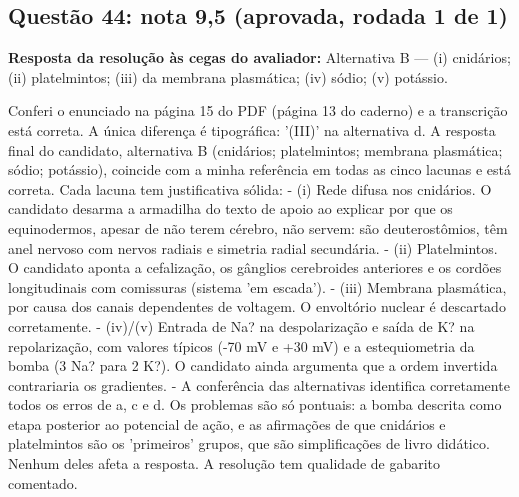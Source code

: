 \documentclass{article}%
\begin{document}
\subsection*{Questão 44: nota 9,5 (aprovada, rodada 1 de 1)}%
\textbf{Resposta da resolução às cegas do avaliador:} Alternativa B --- (i) cnidários; (ii) platelmintos; (iii) da membrana plasmática; (iv) sódio; (v) potássio.\par %
Conferi o enunciado na página 15 do PDF (página 13 do caderno) e a transcrição está correta. A única diferença é tipográfica: '(III)' na alternativa d. A resposta final do candidato, alternativa B (cnidários; platelmintos; membrana plasmática; sódio; potássio), coincide com a minha referência em todas as cinco lacunas e está correta. Cada lacuna tem justificativa sólida:\newline%
{-} (i) Rede difusa nos cnidários. O candidato desarma a armadilha do texto de apoio ao explicar por que os equinodermos, apesar de não terem cérebro, não servem: são deuterostômios, têm anel nervoso com nervos radiais e simetria radial secundária.\newline%
{-} (ii) Platelmintos. O candidato aponta a cefalização, os gânglios cerebroides anteriores e os cordões longitudinais com comissuras (sistema 'em escada').\newline%
{-} (iii) Membrana plasmática, por causa dos canais dependentes de voltagem. O envoltório nuclear é descartado corretamente.\newline%
{-} (iv)/(v) Entrada de Na? na despolarização e saída de K? na repolarização, com valores típicos (-70 mV e +30 mV) e a estequiometria da bomba (3 Na? para 2 K?). O candidato ainda argumenta que a ordem invertida contrariaria os gradientes.\newline%
{-} A conferência das alternativas identifica corretamente todos os erros de a, c e d.\newline%
\newline%
Os problemas são só pontuais: a bomba descrita como etapa posterior ao potencial de ação, e as afirmações de que cnidários e platelmintos são os 'primeiros' grupos, que são simplificações de livro didático. Nenhum deles afeta a resposta. A resolução tem qualidade de gabarito comentado.%
\end{document}
